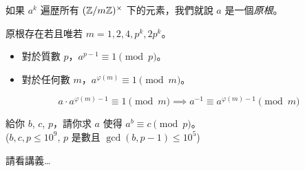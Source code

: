 \documentclass[standalone]{beamer}
\begin{document}
\begin{frame}

  \begin{definition}[原根]
    如果 $a^k$ 遍歴所有 $(\mathbb{Z} / m \mathbb{Z})^\times$ 下的元素，我們就說 $a$ 是一個\emph{原根}。
  \end{definition}
  \pause

  \begin{theorem}[原根存在的條件]
    原根存在若且唯若 $m = 1, 2, 4, p^k, 2p^k$。
  \end{theorem}
  \pause
\end{frame}

\begin{frame}
  \begin{theorem}[Euler 定理]
    \begin{itemize}
      \item 對於質數 $p$，$a^{p-1} \equiv 1 \pmod{p}$。
      \item 對於任何數 $m$，$a^{\varphi(m)} \equiv 1 \pmod{m}$。
    \end{itemize}
  \end{theorem}
  \pause \disskip

  \[ a \cdot a^{\varphi(m) - 1} \equiv 1 \pmod{m} \implies a^{-1} \equiv a^{\varphi(m) - 1} \pmod{m} \]
\end{frame}

\begin{frame}
  \begin{problem}
    給你 $b$, $c$, $p$，請你求 $a$ 使得 $a^b \equiv c \pmod{p}$。\\
    ($b, c, p \leq 10^9$, $p$ 是數且 $\gcd(b, p-1) \leq 10^5$)
  \end{problem} \pause

  請看講義…
\end{frame}
\end{document}
